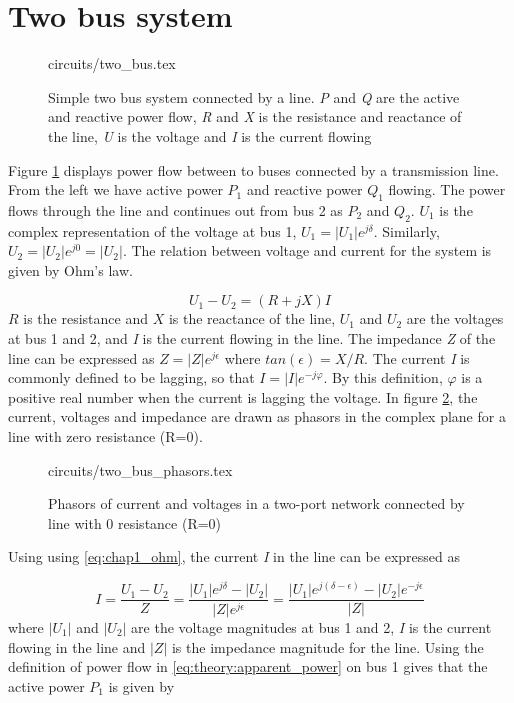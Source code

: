 \documentclass[class=book, crop=false]{standalone}
\begin{document}
\section{Two bus system} 


\begin{figure}[ht!]
    \center
    {circuits/two_bus.tex}
    \caption[size = 9]
    {Simple two bus system connected by a line. \textit{P} and \textit{Q} are the active and reactive power flow, \textit{R} and \textit{X} is the resistance and reactance of the line, \textit{U} is the voltage and \textit{I} is the current flowing}    \label{fig:theory:two_bus}
\end{figure}

Figure \ref{fig:theory:two_bus} displays power flow between to buses connected by a transmission line. From the left we have active power $P_{1}$ and reactive power $Q_{1}$ flowing. The power flows through the line and continues out from bus 2 as $P_{2}$ and $Q_{2}$. $U_{1}$ is the complex representation of the voltage at bus 1, $U_{1} = |U_{1}|e^{j\delta}$. Similarly, $U_{2} = |U_{2}|e^{j0} = |U_{2}|$. The relation between voltage and current for the system is given by Ohm's law.

\begin{equation}\label{eq:chap1_ohm}
    U_{1} - U_{2} = (R + jX)I
\end{equation}
$R$ is the resistance and $X$ is the reactance of the line, $U_{1}$ and $U_{2}$ are the voltages at bus 1 and 2, and \textit{I} is the current flowing in the line. The impedance \textit{Z} of the line can be expressed as $Z = |Z|e^{j\epsilon}$ where $tan (\epsilon) = X/R$. The current \textit{I} is commonly defined to be lagging, so that $I = |I|e^{-j\varphi}$. By this definition, $\varphi$ is a positive real number when the current is lagging the voltage. In figure \ref{fig:theory:two_bus_phasor}, the current, voltages and impedance are drawn as phasors in the complex plane for a line with zero resistance (R=0).


\begin{figure}[ht!]
    \center
    {circuits/two_bus_phasors.tex}
    \caption[size = 9]{Phasors of current and voltages in a two-port network connected by line with 0 resistance (R=0)}
    \label{fig:theory:two_bus_phasor}
\end{figure}

Using using \eqref{eq:chap1_ohm}, the current \textit{I} in the line can be expressed as

\begin{equation}\label{eq:two_port_current}
    I  = \frac{U_{1} - U_{2}}{Z}
    = \frac{|U_{1}|e^{j\delta} - |U_{2}|}{|Z|e^{j\epsilon}}
    = \frac{|U_{1}|e^{j(\delta- \epsilon)} - |U_{2}|e^{-j\epsilon}}{|Z|}
\end{equation}
where $|U_{1}|$ and $|U_{2}|$ are the voltage magnitudes at bus 1 and 2, \textit{I} is the current flowing in the line and $|Z|$ is the impedance magnitude for the line. Using the definition of power flow in \eqref{eq:theory:apparent_power} on bus 1 gives that the active power $P_{1}$ is given by
\end{document}
